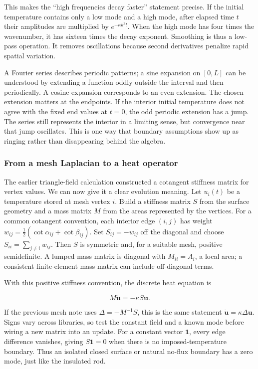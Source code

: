 This makes the ``high frequencies decay faster'' statement precise. If the initial temperature contains only a low mode and a high mode, after elapsed time \(t\) their amplitudes are multiplied by \(e^{-\kappa k^2t}\). When the high mode has four times the wavenumber, it has sixteen times the decay exponent. Smoothing is thus a low-pass operation. It removes oscillations because second derivatives penalize rapid spatial variation.

A Fourier series describes periodic patterns; a sine expansion on \([0,L]\) can be understood by extending a function oddly outside the interval and then periodically. A cosine expansion corresponds to an even extension. The chosen extension matters at the endpoints. If the interior initial temperature does not agree with the fixed end values at \(t=0\), the odd periodic extension has a jump. The series still represents the interior in a limiting sense, but convergence near that jump oscillates. This is one way that boundary assumptions show up as ringing rather than disappearing behind the algebra.

\subsubsection{From a mesh Laplacian to a heat operator}\label{02-foundations-ii-ch025-from-a-mesh-laplacian-to-a-heat-operator}

\hypertarget{02-foundations-ii-ch025-from-a-mesh-laplacian-to-a-heat-operator}{}

The earlier triangle-field calculation constructed a cotangent stiffness matrix for vertex values. We can now give it a clear evolution meaning. Let \(u_i(t)\) be a temperature stored at mesh vertex \(i\). Build a stiffness matrix \(S\) from the surface geometry and a mass matrix \(M\) from the areas represented by the vertices. For a common cotangent convention, each interior edge \((i,j)\) has weight \(w_{ij}=\tfrac12(\cot\alpha_{ij}+\cot\beta_{ij})\). Set \(S_{ij}=-w_{ij}\) off the diagonal and choose \(S_{ii}=\sum_{j\ne i}w_{ij}\). Then \(S\) is symmetric and, for a suitable mesh, positive semidefinite. A lumped mass matrix is diagonal with \(M_{ii}=A_i\), a local area; a consistent finite-element mass matrix can include off-diagonal terms.

With this positive stiffness convention, the discrete heat equation is

\[
M\dot{\mathbf u}=-\kappa S\mathbf u.
\]

If the previous mesh note uses \(\Delta=-M^{-1}S\), this is the same statement \(\dot{\mathbf u}=\kappa\Delta\mathbf u\). Signs vary across libraries, so test the constant field and a known mode before wiring a new matrix into an update. For a constant vector \(\mathbf 1\), every edge difference vanishes, giving \(S\mathbf 1=0\) when there is no imposed-temperature boundary. Thus an isolated closed surface or natural no-flux boundary has a zero mode, just like the insulated rod.

